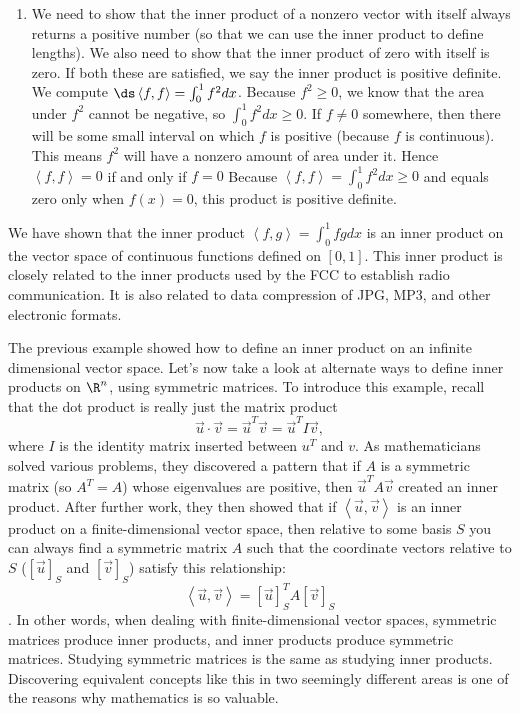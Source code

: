 \begin{example}
\begin{enumerate}
 	\item We need to show that the inner product of a nonzero vector with itself always returns a positive number (so that we can use the inner product to define lengths).  We also need to show that the inner product of zero with itself is zero. If both these are satisfied, we say the inner product is positive definite. 
 	We compute $\ds \left<f,f\right> = \int_0^1 f^2 dx$.  Because $f^2 \geq 0$, we know that the area under $f^2$ cannot be negative, so $\int_0^1 f^2dx \geq 0$. If $f\neq 0$ somewhere, then there will be some small interval on which $f$ is positive (because $f$ is continuous). This means $f^2$ will have a nonzero amount of area under it.  Hence $\left<f,f\right> =0$ if and only if $f=0$ 
Because $\left<f,f\right> = \int_0^1 f^2 dx \geq 0$ and equals zero only when $f(x)=0$, this product is positive definite.
\end{enumerate}
We have shown that the inner product $\left<f,g\right> = \int_0^1 fg dx $ is an inner product on the vector space of continuous functions defined on $[0,1]$.  This inner product is closely related to the inner products used by the FCC to establish radio communication.  It is also related to data compression of JPG, MP3, and other electronic formats. 
\end{example}



The previous example showed how to define an inner product on an infinite dimensional vector space.  
Let's now take a look at alternate ways to define inner products on $\R^n$, using symmetric matrices. 
To introduce this example, recall that the dot product is really just the matrix product 
$$\vec u\cdot \vec v = \vec u^T\vec v = \vec u^T I \vec v,$$
where $I$ is the identity matrix inserted between $u^T$ and $v$.
As mathematicians solved various problems, they discovered a pattern that if $A$ is a symmetric matrix (so $A^T=A$) whose eigenvalues are positive, then $\vec u^T A \vec v$ created an inner product. After further work, they then showed that if $\left<\vec u,\vec v\right>$ is an inner product on a finite-dimensional vector space, then relative to some basis $S$ you can always find a symmetric matrix $A$ such that the coordinate vectors relative to $S$ ($[\vec u]_S$ and $[\vec v]_S$) satisfy this relationship:
$$\left<\vec u,\vec v\right> = [\vec u]_S^T A [\vec v]_S$$.  
In other words, when dealing with finite-dimensional vector spaces, symmetric matrices produce inner products, and inner products produce symmetric matrices. Studying symmetric matrices is the same as studying inner products.  Discovering equivalent concepts like this in two seemingly different areas is one of the reasons why mathematics is so valuable.

